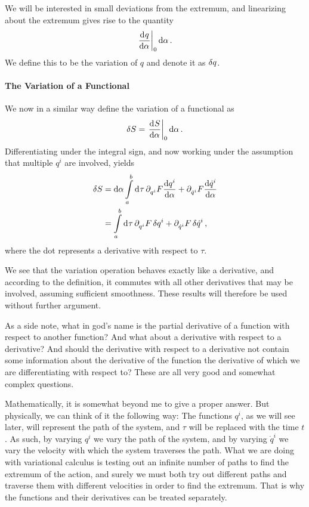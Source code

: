 We will be interested in small deviations from the extremum, and linearizing about the extremum gives rise to the quantity
\begin{align*}
	\deval{q}{\alpha}{0}\dd{\alpha}.
\end{align*}
We define this to be the variation of $q$ and denote it as $\var{q}$.


\paragraph{The Variation of a Functional}
We now in a similar way define the variation of a functional as
\begin{align*}
	\var{S} = \deval{S}{\alpha}{0}\dd{\alpha}.
\end{align*}
Differentiating under the integral sign, and now working under the assumption that multiple $q^{i}$ are involved, yields
\begin{align*}
	\var{S} &= \dd{\alpha}\int\limits_{a}^{b}\dd[]{\tau}\partial^{}_{q^{i}}F\dv{q^{i}}{\alpha} + \partial^{}_{\dot{q}^{i}}F\dv{\dot{q}^{i}}{\alpha} \\
	        &= \int\limits_{a}^{b}\dd[]{\tau}\partial^{}_{q^{i}}F\var{q^{i}} + \partial^{}_{\dot{q}^{i}}F\var{\dot{q}^{i}},
\end{align*}
where the dot represents a derivative with respect to $\tau$.

We see that the variation operation behaves exactly like a derivative, and according to the definition, it commutes with all other derivatives that may be involved, assuming sufficient smoothness. These results will therefore be used without further argument.

As a side note, what in god's name is the partial derivative of a function with respect to another function? And what about a derivative with respect to a derivative? And should the derivative with respect to a derivative not contain some information about the derivative of the function the derivative of which we are differentiating with respect to? These are all very good and somewhat complex questions.

Mathematically, it is somewhat beyond me to give a proper answer. But physically, we can think of it the following way: The functions $q^{i}$, as we will see later, will represent the path of the system, and $\tau$ will be replaced with the time $t$. As such, by varying $q^{i}$ we vary the path of the system, and by varying $\dot{q}^{i}$ we vary the velocity with which the system traverses the path. What we are doing with variational calculus is testing out an infinite number of paths to find the extremum of the action, and surely we must both try out different paths and traverse them with different velocities in order to find the extremum. That is why the functions and their derivatives can be treated separately.

